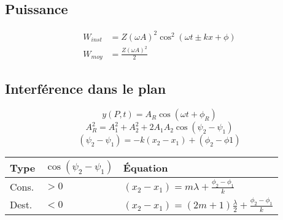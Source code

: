 \subsection{Puissance}
\begin{align*}
    W_{\textit{inst}} &= Z(\omega A)^2\cos^2(\omega t \pm kx +\phi)\\
    W_{\textit{moy}} &= \frac{Z(\omega A)^2}{2}
\end{align*}


\subsection{Interférence dans le plan}
\begin{center}
    
\end{center}
\[y(P,t)=A_R \cos (\omega t +\phi_R)\]
\[A_R^2=A_1^2+A_2^2+2A_1 A_2\cos (\psi_2-\psi_1) \]
\[(\psi_2-\psi_1)=-k(x_2-x_1)+(\phi_2-\phi1)\]




\begin{tabular}{lll}
    Type & $\cos(\psi_2 - \psi_1)$ & Équation\\\hline
    Cons. & $>0$ & \((x_2-x_1)=m\lambda + \frac{\phi_2-\phi_1}{k}\)\\
    Dest. & $<0$ & \((x_2-x_1)=(2m+1)\frac{\lambda}{2}+\frac{\phi_2-\phi_1}{k}\)
\end{tabular}



